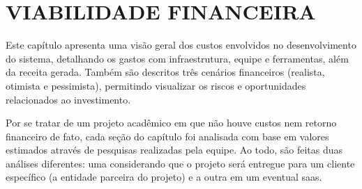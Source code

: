 \chapter{VIABILIDADE FINANCEIRA}

Este capítulo apresenta uma visão geral dos custos envolvidos no desenvolvimento do sistema, detalhando os gastos com infraestrutura, equipe e ferramentas, além da receita gerada. Também são descritos três cenários financeiros (realista, otimista e pessimista), permitindo visualizar os riscos e oportunidades relacionados ao investimento.

Por se tratar de um projeto acadêmico em que não houve custos nem retorno financeiro de fato, cada seção do capítulo foi analisada com base em valores estimados através de pesquisas realizadas pela equipe. Ao todo, são feitas duas análises diferentes: uma considerando que o projeto será entregue para um cliente específico (a entidade parceira do projeto) e a outra em um eventual \gls{saas}.



